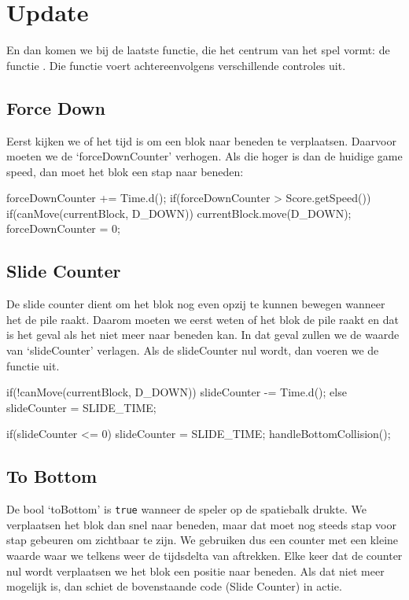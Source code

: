 \section{Update}
En dan komen we bij de laatste functie, die het centrum van het spel vormt: de functie . Die functie voert achtereenvolgens verschillende controles uit. 

\subsection{Force Down}
Eerst kijken we of het tijd is om een blok naar beneden te verplaatsen. Daarvoor moeten we de `forceDownCounter' verhogen. Als die hoger is dan de huidige game speed, dan moet het blok een stap naar beneden:

\begin{code}
forceDownCounter += Time.d();
if(forceDownCounter > Score.getSpeed())
{
	 if(canMove(currentBlock, D_DOWN))
	 {
			currentBlock.move(D_DOWN);
			forceDownCounter = 0;
	 }
}
\end{code}

\subsection{Slide Counter}
De slide counter dient om het blok nog even opzij te kunnen bewegen wanneer het de pile raakt. Daarom moeten we eerst weten of het blok de pile raakt en dat is het geval als het niet meer naar beneden kan. In dat geval zullen we de waarde van `slideCounter' verlagen. Als de slideCounter nul wordt, dan voeren we de functie  uit.

\begin{code}
if(!canMove(currentBlock, D_DOWN))
{
	 slideCounter -= Time.d();
} else
{
	 slideCounter = SLIDE_TIME;
}

if(slideCounter <= 0)
{
	 slideCounter = SLIDE_TIME;
	 handleBottomCollision();
}
\end{code}

\subsection{To Bottom}
De bool `toBottom' is \verb|true| wanneer de speler op de spatiebalk drukte. We verplaatsen het blok dan snel naar beneden, maar dat moet nog steeds stap voor stap gebeuren om zichtbaar te zijn. We gebruiken dus een counter met een kleine waarde waar we telkens weer de tijdsdelta van aftrekken. Elke keer dat de counter nul wordt verplaatsen we het blok een positie naar beneden. Als dat niet meer mogelijk is, dan schiet de bovenstaande code (Slide Counter) in actie.

